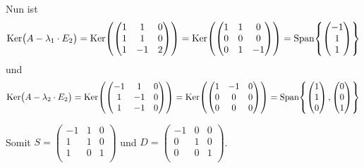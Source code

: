 \documentclass{scrreprt}
\begin{document}
\begin{enumerate}[(a)]
\begin{enumerate}[(i)]
    Nun ist
    \[
      \text{Ker}\qty\big(A - \lambda_1 \cdot E_2)
      = \text{Ker}\qty(\begin{pmatrix}
        1 & 1  & 0 \\
        1 & 1  & 0 \\
        1 & -1 & 2 \\
      \end{pmatrix})
      = \text{Ker}\qty(\begin{pmatrix}
        1 & 1 & 0  \\
        0 & 0 & 0  \\
        0 & 1 & -1 \\
      \end{pmatrix})
      = \text{Span}\qty{\begin{pmatrix} -1 \\ 1 \\ 1 \end{pmatrix}}
    \]
    und
    \[
      \text{Ker}\qty\big(A - \lambda_2 \cdot E_2)
      = \text{Ker}\qty(\begin{pmatrix}
        -1 & 1   & 0 \\
        1  & -1  & 0 \\
        1  & -1  & 0 \\
      \end{pmatrix})
      = \text{Ker}\qty(\begin{pmatrix}
        1  & -1  & 0 \\
        0  & 0   & 0 \\
        0  & 0   & 0 \\
      \end{pmatrix})
      = \text{Span}\qty{
        \begin{pmatrix} 1 \\ 1 \\ 0 \end{pmatrix},
        \begin{pmatrix} 0 \\ 0 \\ 1 \end{pmatrix}
      }
    \]

    Somit $S = \begin{pmatrix}
      -1 & 1 & 0 \\
      1  & 1 & 0 \\
      1  & 0 & 1 \\
    \end{pmatrix}$ und $D = \begin{pmatrix}
      -1 & 0 & 0 \\
      0  & 1 & 0 \\
      0  & 0 & 1 \\
    \end{pmatrix}$.
  \end{enumerate}


\end{enumerate}
\end{document}
